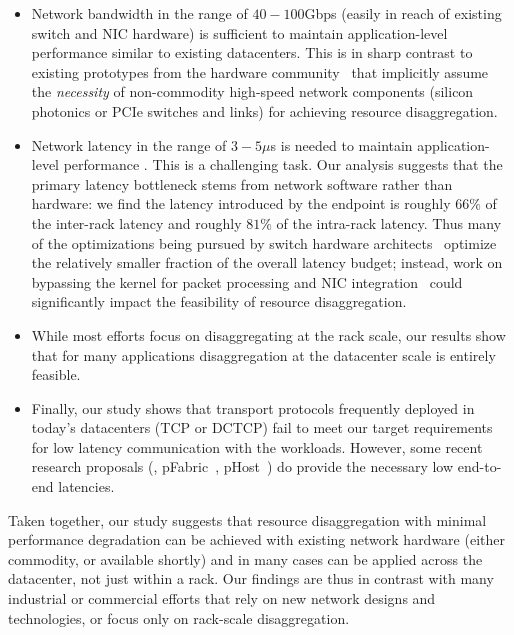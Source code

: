 \begin{itemize}[leftmargin=*]
\itemsep0em
	\item Network bandwidth in the range of $40-100$Gbps (easily in reach of existing switch and NIC hardware) is sufficient to maintain application-level performance similar to existing datacenters. This is in sharp contrast to existing prototypes from the hardware community~\cite{rsa, fdr, hptm, seamicro, firebox, sonuma, ddcHwDesign1} that implicitly assume the {\em necessity} of non-commodity high-speed network components (silicon photonics or PCIe switches and links) for achieving resource disaggregation.
	\item Network latency in the range of $3-5\mu$s is needed to maintain application-level performance . This is a challenging task. Our analysis suggests that the primary latency bottleneck stems from  network software rather than hardware: we find the latency introduced by the endpoint is roughly $66\%$ of the inter-rack latency and roughly $81\%$ of the intra-rack latency. Thus many of the optimizations being pursued by switch hardware architects~\cite{mellanox} optimize the relatively smaller fraction of the overall latency budget; instead, work on bypassing the kernel for packet processing and NIC integration~\cite{cpu-nic} could significantly impact the feasibility of resource disaggregation.
	\item While most efforts focus on disaggregating at the rack scale, our results show that for many applications disaggregation at the datacenter scale is entirely feasible.  
 	\item Finally, our study shows that transport protocols frequently deployed in today's datacenters (TCP or DCTCP) fail to meet our target requirements for low latency communication with the \dis workloads. However, some recent research proposals (\eg, pFabric~\cite{pfabric}, pHost~\cite{phost}) do provide  the necessary low end-to-end latencies. \rc{}
\end{itemize} 

\noindent
Taken together, our study suggests that resource disaggregation with minimal performance degradation can be achieved with existing network hardware (either commodity, or available shortly) and in many cases can be applied across the datacenter, not just within a rack. Our findings are thus in contrast with many industrial or commercial efforts that rely on new network designs and technologies, or focus only on rack-scale disaggregation.

